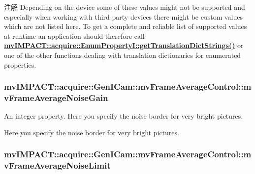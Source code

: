 \begin{DoxyNote}{注解}
Depending on the device some of these values might not be supported and especially when working with third party devices there might be custom values which are not listed here. To get a complete and reliable list of supported values at runtime an application should therefore call {\bfseries \hyperlink{classmv_i_m_p_a_c_t_1_1acquire_1_1_enum_property_i_a0ba6ccbf5ee69784d5d0b537924d26b6}{mv\+I\+M\+P\+A\+C\+T\+::acquire\+::\+Enum\+Property\+I\+::get\+Translation\+Dict\+Strings()}} or one of the other functions dealing with translation dictionaries for enumerated properties. 
\end{DoxyNote}
\hypertarget{classmv_i_m_p_a_c_t_1_1acquire_1_1_gen_i_cam_1_1mv_frame_average_control_ab07c97e67b40044a87b4fc9b511d6c8b}{
\subsubsection[{mv\+Frame\+Average\+Noise\+Gain}]{ mv\+I\+M\+P\+A\+C\+T\+::acquire\+::\+Gen\+I\+Cam\+::mv\+Frame\+Average\+Control\+::mv\+Frame\+Average\+Noise\+Gain}}\label{classmv_i_m_p_a_c_t_1_1acquire_1_1_gen_i_cam_1_1mv_frame_average_control_ab07c97e67b40044a87b4fc9b511d6c8b}


An integer property. Here you specify the noise border for very bright pictures. 

Here you specify the noise border for very bright pictures. \hypertarget{classmv_i_m_p_a_c_t_1_1acquire_1_1_gen_i_cam_1_1mv_frame_average_control_a9a3013a03a3e271aa1ec174b3804666a}{
\subsubsection[{mv\+Frame\+Average\+Noise\+Limit}]{ mv\+I\+M\+P\+A\+C\+T\+::acquire\+::\+Gen\+I\+Cam\+::mv\+Frame\+Average\+Control\+::mv\+Frame\+Average\+Noise\+Limit}}\label{classmv_i_m_p_a_c_t_1_1acquire_1_1_gen_i_cam_1_1mv_frame_average_control_a9a3013a03a3e271aa1ec174b3804666a}


